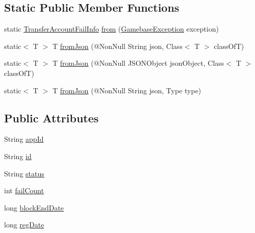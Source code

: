 \subsection*{Static Public Member Functions}
\begin{DoxyCompactItemize}
\item 
static \hyperlink{classcom_1_1toast_1_1android_1_1gamebase_1_1auth_1_1transfer_1_1data_1_1_transfer_account_fail_info}{Transfer\+Account\+Fail\+Info} \hyperlink{classcom_1_1toast_1_1android_1_1gamebase_1_1auth_1_1transfer_1_1data_1_1_transfer_account_fail_info_aecfb04c0e705db55ec4e81508e1c3a05}{from} (\hyperlink{classcom_1_1toast_1_1android_1_1gamebase_1_1base_1_1_gamebase_exception}{Gamebase\+Exception} exception)
\item 
static$<$ T $>$ T \hyperlink{classcom_1_1toast_1_1android_1_1gamebase_1_1base_1_1_value_object_ae6655c88c20a9a8406dc11b46250ac7b}{from\+Json} (@Non\+Null String json, Class$<$ T $>$ class\+OfT)
\item 
static$<$ T $>$ T \hyperlink{classcom_1_1toast_1_1android_1_1gamebase_1_1base_1_1_value_object_ab83c4196ee2e3f11553bbe0f04dc2101}{from\+Json} (@Non\+Null J\+S\+O\+N\+Object json\+Object, Class$<$ T $>$ class\+OfT)
\item 
static$<$ T $>$ T \hyperlink{classcom_1_1toast_1_1android_1_1gamebase_1_1base_1_1_value_object_aa901d97d495150b54bcb80c05672f58a}{from\+Json} (@Non\+Null String json, Type type)
\end{DoxyCompactItemize}
\subsection*{Public Attributes}
\begin{DoxyCompactItemize}
\item 
String \hyperlink{classcom_1_1toast_1_1android_1_1gamebase_1_1auth_1_1transfer_1_1data_1_1_transfer_account_fail_info_ab4a589a669da5b4ff67e5d4443d1cc10}{app\+Id}
\item 
String \hyperlink{classcom_1_1toast_1_1android_1_1gamebase_1_1auth_1_1transfer_1_1data_1_1_transfer_account_fail_info_a76010eef1edc0406cc2375c25d2a433d}{id}
\item 
String \hyperlink{classcom_1_1toast_1_1android_1_1gamebase_1_1auth_1_1transfer_1_1data_1_1_transfer_account_fail_info_a4e531c185af848083db0808335a78168}{status}
\item 
int \hyperlink{classcom_1_1toast_1_1android_1_1gamebase_1_1auth_1_1transfer_1_1data_1_1_transfer_account_fail_info_a7e113fb3b583f0cc2f772dd8bf36f8ab}{fail\+Count}
\item 
long \hyperlink{classcom_1_1toast_1_1android_1_1gamebase_1_1auth_1_1transfer_1_1data_1_1_transfer_account_fail_info_afc4583aaf2bed315513a89152f759e1e}{block\+End\+Date}
\item 
long \hyperlink{classcom_1_1toast_1_1android_1_1gamebase_1_1auth_1_1transfer_1_1data_1_1_transfer_account_fail_info_ac7e034092dcf8f382dc6d1b950bc5627}{reg\+Date}
\end{DoxyCompactItemize}


